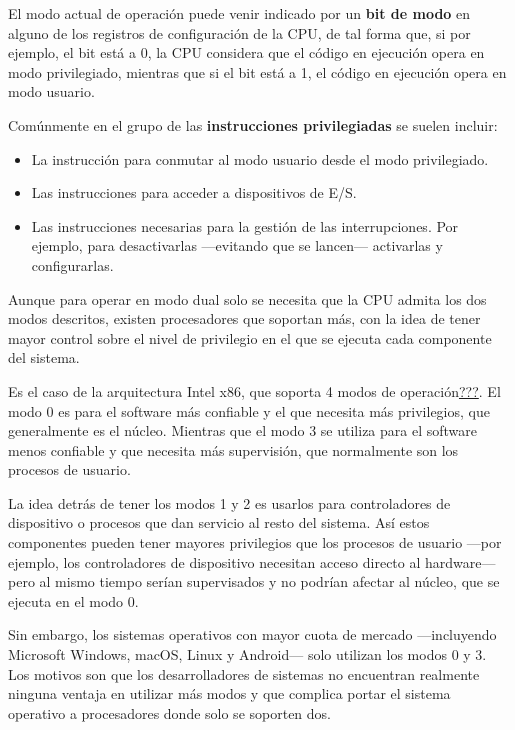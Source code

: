 El modo actual de operación puede venir indicado por un \textbf{bit de
modo}{} en alguno de los registros de configuración de la CPU, de tal
forma que, si por ejemplo, el bit está a 0, la CPU considera que el
código en ejecución opera en modo privilegiado, mientras que si el bit
está a 1, el código en ejecución opera en modo usuario.

Comúnmente en el grupo de las \textbf{instrucciones privilegiadas} se
suelen incluir:

\begin{itemize}
\item
  La instrucción para conmutar al modo usuario desde el modo
  privilegiado.
\item
  Las instrucciones para acceder a dispositivos de E/S.
\item
  Las instrucciones necesarias para la gestión de las interrupciones.
  Por ejemplo, para desactivarlas ---evitando que se lancen---
  activarlas y configurarlas.
\end{itemize}

Aunque para operar en modo dual solo se necesita que la CPU admita los
dos modos descritos, existen procesadores que soportan más, con la idea
de tener mayor control sobre el nivel de privilegio en el que se ejecuta
cada componente del sistema.

Es el caso de la arquitectura Intel x86, que soporta 4 modos de
operación\hyperref[Wikipedia-Anillo]{???}. El modo 0 es para el software
más confiable y el que necesita más privilegios, que generalmente es el
núcleo. Mientras que el modo 3 se utiliza para el software menos
confiable y que necesita más supervisión, que normalmente son los
procesos de usuario.

La idea detrás de tener los modos 1 y 2 es usarlos para controladores de
dispositivo o procesos que dan servicio al resto del sistema. Así estos
componentes pueden tener mayores privilegios que los procesos de usuario
---por ejemplo, los controladores de dispositivo necesitan acceso
directo al hardware--- pero al mismo tiempo serían supervisados y no
podrían afectar al núcleo, que se ejecuta en el modo 0.

Sin embargo, los sistemas operativos con mayor cuota de mercado
---incluyendo Microsoft Windows, macOS, Linux y Android--- solo utilizan
los modos 0 y 3. Los motivos son que los desarrolladores de sistemas no
encuentran realmente ninguna ventaja en utilizar más modos y que
complica portar el sistema operativo a procesadores donde solo se
soporten dos.

